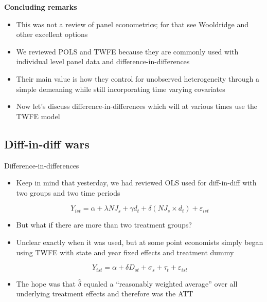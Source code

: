 \documentclass{beamer}
\begin{document}
\begin{frame}[plain]
\begin{center}
\textbf{Concluding remarks}
\end{center}

\begin{itemize}
\item This was not a review of panel econometrics; for that see Wooldridge and other excellent options
\item We reviewed POLS and TWFE because they are commonly used with individual level panel data and difference-in-differences
\item Their main value is how they control for unobserved heterogeneity through a simple demeaning while still incorporating time varying covariates
\item Now let's discuss difference-in-differences which will at various times use the TWFE model
\end{itemize}

\end{frame}

\subsection{Diff-in-diff wars}

\begin{frame}{Difference-in-differences}

\begin{itemize}
\item Keep in mind that yesterday, we had reviewed OLS used for diff-in-diff with two groups and two time periods

$$Y_{ist} = \alpha + \lambda NJ_s + \gamma d_t + \delta (NJ_s \times d_t) + \varepsilon_{ist}$$

\item But what if there are more than two treatment groups?
\item Unclear exactly when it was used, but at some point economists simply began using TWFE with state and year fixed effects and treatment dummy

$$ Y_{ist} = \alpha + \delta D_{st} + \sigma_s + \tau_t + \varepsilon_{ist}$$

\item The hope was that $\widehat{\delta}$ equaled a ``reasonably weighted average'' over all underlying treatment effects and therefore was the ATT
\end{itemize}

\end{frame}
\end{document}
